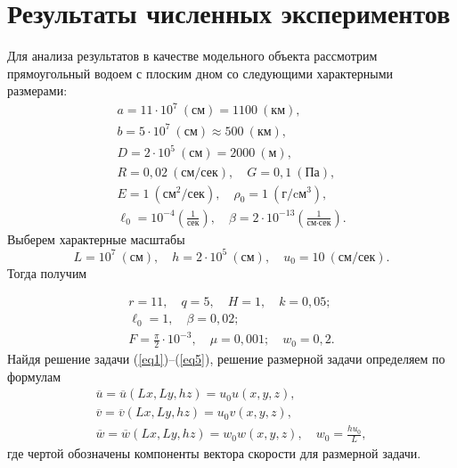 \documentclass[press]{vestnik}
\begin{document}
\vspace{4mm}
\section{Результаты численных экспериментов}\label{sec4}

Для анализа результатов в качестве модельного объекта рассмотрим 
прямоугольный водоем с плоским дном со следующими характерными размерами:
\[
\begin{gathered}
 a=11\cdot 10^{7}~(\text{см})=1100~(\text{км}), \\ 
 b=5\cdot 10^{7}~(\text{см})\approx 500~(\text{км}), \\ 
 D=2\cdot 10^{5}~(\text{см})=2000~(\text{м}), \\ 
 R=0,02~\left( {\text{см}/\text{сек}} \right),\quad G=0,1~(\text{Па}), \\ 
 E=1~(\text{см}^2/\text{сек}), \quad \rho_{0} =1~(\text{г}/\text{cм}^3), \\ 
 \ell_{0} =10^{-4} \left( \frac{1}{\text{сек}} \right),\quad \beta =2\cdot 10^{-13}\left( \frac{1}{\text{см}\cdot\text{сек}} \right). 
\end{gathered}
\]
Выберем характерные масштабы
\[
L=10^{7}~(\text{см}),\quad h=2\cdot 10^{5}~(\text{см}),\quad u_{0} =10~(\text{см}/\text{сек}).
\]
Тогда получим

\[
\begin{gathered}
 r=11,\quad q=5,\quad H=1,\quad k=0,05;\\ 
 \ell_{0} =1,\quad \beta =0,02; \\ 
 F=\frac{\pi }{2}\cdot 10^{-3},\quad \mu =0,001;\quad w_{0} =0,2.
 \end{gathered}
\]
Найдя решение задачи (\ref{eq1})--(\ref{eq5}), решение размерной задачи определяем по 
формулам
\[
\begin{gathered}
 \overline u =\overline u \left( {Lx,Ly,hz} \right)=u_{0}  u\left( 
{x,y,z} \right), \\ 
 \overline v =\overline v \left( {Lx,Ly,hz} \right)=u_{0}  v\left( 
{x,y,z} \right), \\ 
 \overline w =\overline w \left( {Lx,Ly,hz} \right)=w_{0}  w\left( 
{x,y,z} \right),\quad w_{0} =\frac{hu_{0} }{L},
 \end{gathered}
\]
где чертой обозначены компоненты вектора скорости для размерной задачи.
\end{document}
